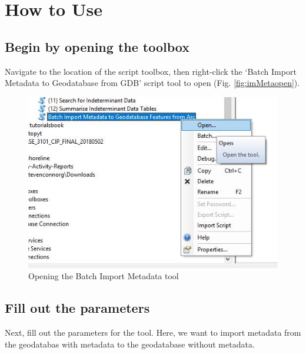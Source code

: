 \documentclass[openany]{book}
\theoremstyle{definition}
\theoremstyle{definition}
\theoremstyle{definition}
\theoremstyle{remark}
\begin{document}
\section{How to Use}\label{how-to-use-12}

\subsection{Begin by opening the
toolbox}\label{begin-by-opening-the-toolbox-12}

Navigate to the location of the script toolbox, then right-click the
`Batch Import Metadata to Geodatabase from GDB' script tool to open
(Fig. \ref{fig:imMetaopen}).

\begin{figure}[H]

{\centering \includegraphics{figures/imMetaArc-open} 

}

\caption{Opening the Batch Import Metadata tool}\label{fig:imMetaArcopen}
\end{figure}

\subsection{Fill out the parameters}\label{fill-out-the-parameters-12}

Next, fill out the parameters for the tool. Here, we want to import
metadata from the geodatabas with metadata to the geodatabase without
metadata.
\end{document}
